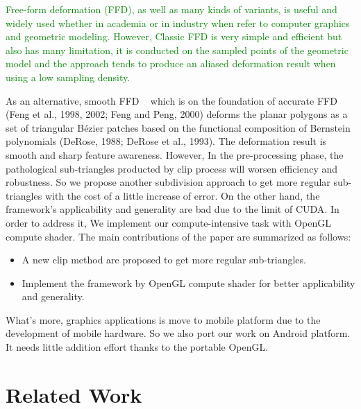 \documentclass[3p]{elsarticle}
\begin{document}
\textcolor{green}{Free-form deformation (FFD\cite{Sederberg86}), as well as many kinds of variants, is useful and widely used whether in academia or in industry when refer to computer graphics and geometric modeling. However, Classic FFD is very simple and efficient but also has many limitation, it is conducted on the sampled points of the geometric model and the approach tends to produce an aliased deformation result when using a low sampling density.}

As an alternative, smooth FFD ~\cite{Cui13, Cui14, Cui15} which is on the foundation of accurate FFD (Feng et al., 1998, 2002; Feng and Peng, 2000) deforms the planar polygons as a set of triangular Bézier patches based on the functional composition of Bernstein polynomials (DeRose, 1988; DeRose et al., 1993). The deformation result is smooth and sharp feature awareness. However, In the pre-processing phase, the pathological sub-triangles producted by clip process will worsen efficiency and robustness. So we propose another subdivision approach to get more regular sub-triangles with the cost of a little increase of error. On the other hand, the framework's applicability and generality are bad due to the limit of CUDA. In order to address it, We implement our compute-intensive task with OpenGL compute shader.
The main contributions of the paper are summarized as follows:
\begin{itemize}
    \item A new clip method are proposed to get more regular sub-triangles.
    \item Implement the framework by OpenGL compute shader for better applicability and generality.
\end{itemize}

What's more, graphics applications is move to mobile platform due to the development of mobile hardware. So we also port our work on Android platform. It needs little addition effort thanks to the portable OpenGL.

\section{Related Work}\label{sec:related}
\end{document}
